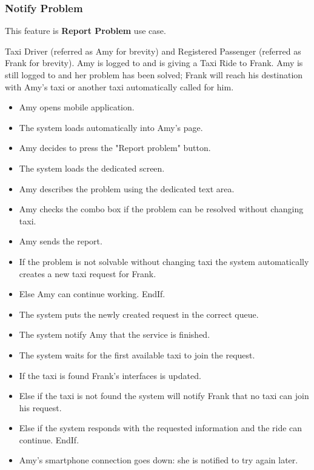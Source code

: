 \subsubsection{Notify Problem}
This feature is \textbf{Report Problem} use case.
\begin{itemize}
	 Taxi Driver (referred as Amy for brevity) and Registered Passenger (referred as Frank for brevity).
	 Amy is logged to \myTaxiService{} and is giving a Taxi Ride to Frank.
	 Amy is still logged to \myTaxiService{} and her problem has been solved; Frank will reach his destination with Amy's taxi or another taxi automatically called for him.
	\begin{itemize}
		\item Amy opens \myTaxiService{} mobile application.
		\item The system loads automatically into Amy's page.
		\item Amy decides to press the "Report problem" button.
		\item The system loads the dedicated screen.
		\item Amy describes the problem using the dedicated text area.
		\item Amy checks the combo box if the problem can be resolved without changing taxi.
		\item Amy sends the report.
		\item If the problem is not solvable without changing taxi the system automatically creates a new taxi request for Frank.
		\item Else Amy can continue working. EndIf.
		\item The system puts the newly created request in the correct queue.
		\item The system notify Amy that the service is finished.
		\item The system waits for the first available taxi to join the request.
		\item If the taxi is found Frank's interfaces is updated.
		\item Else if the taxi is not found the system will notify Frank that no taxi can join his request.
		\item Else if the system responds with the requested information and the ride can continue. EndIf.
	\end{itemize}
	\begin{itemize}
		\item Amy's smartphone connection goes down: she is notified to try again later.
	\end{itemize}
\end{itemize}
